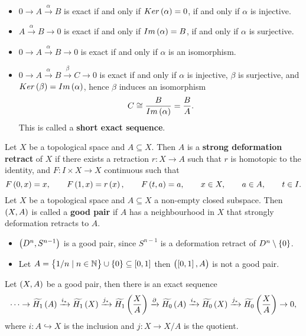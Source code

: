 \begin{example*}
\hfill
\begin{itemize}
\item $ 0 \to A \xrightarrow{\alpha} B $ is exact if and only if $ Ker\br{\alpha} = 0 $, if and only if $ \alpha $ is injective.
\item $ A \xrightarrow{\alpha} B \to 0 $ is exact if and only if $ Im\br{\alpha} = B $, if and only if $ \alpha $ is surjective.
\item $ 0 \to A \xrightarrow{\alpha} B \to 0 $ is exact if and only if $ \alpha $ is an isomorphism.
\item $ 0 \to A \xrightarrow{\alpha} B \xrightarrow{\beta} C \to 0 $ is exact if and only if $ \alpha $ is injective, $ \beta $ is surjective, and $ Ker\br{\beta} = Im\br{\alpha} $, hence $ \beta $ induces an isomorphism
$$ C \cong \dfrac{B}{Im\br{\alpha}} = \dfrac{B}{A}. $$
This is called a \textbf{short exact sequence}.
\end{itemize}
\end{example*}

\begin{definition*}
Let $ X $ be a topological space and $ A \subseteq X $. Then $ A $ is a \textbf{strong deformation retract} of $ X $ if there exists a retraction $ r : X \to A $ such that $ r $ is homotopic to the identity, and $ F : I \times X \to X $ continuous such that
$$ F\br{0, x} = x, \qquad F\br{1, x} = r\br{x}, \qquad F\br{t, a} = a, \qquad x \in X, \qquad a \in A, \qquad t \in I. $$
Let $ X $ be a topological space and $ A \subseteq X $ a non-empty closed subspace. Then $ \br{X, A} $ is called a \textbf{good pair} if $ A $ has a neighbourhood in $ X $ that strongly deformation retracts to $ A $.
\end{definition*}

\begin{example*}
\hfill
\begin{itemize}
\item $ \br{D^n, S^{n - 1}} $ is a good pair, since $ S^{n - 1} $ is a deformation retract of $ D^n \setminus \cbr{0} $.
\item Let $ A = \cbr{1 / n \mid n \in \N} \cup \cbr{0} \subseteq \sbr{0, 1} $ then $ \br{\sbr{0, 1}, A} $ is not a good pair.
\end{itemize}
\end{example*}

\begin{theorem}
\label{thm:2.13}
Let $ \br{X, A} $ be a good pair, then there is an exact sequence
$$ \dots \to \widetilde{H_1}\br{A} \xrightarrow{i_*} \widetilde{H_1}\br{X} \xrightarrow{j_*} \widetilde{H_1}\br{\dfrac{X}{A}} \xrightarrow{\partial} \widetilde{H_0}\br{A} \xrightarrow{i_*} \widetilde{H_0}\br{X} \xrightarrow{j_*} \widetilde{H_0}\br{\dfrac{X}{A}} \to 0, $$
where $ i : A \hookrightarrow X $ is the inclusion and $ j : X \to X / A $ is the quotient.
\end{theorem}

